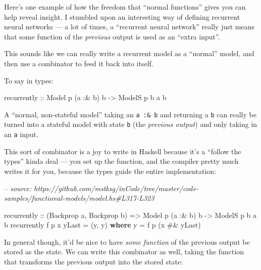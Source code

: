 \documentclass[]{article}
\newenvironment{Shaded}{}{}
\newcommand{\CommentTok}[1]{\textcolor[rgb]{0.38,0.63,0.69}{\textit{#1}}}
\newcommand{\DataTypeTok}[1]{\textcolor[rgb]{0.56,0.13,0.00}{#1}}
\newcommand{\FunctionTok}[1]{\textcolor[rgb]{0.02,0.16,0.49}{#1}}
\newcommand{\KeywordTok}[1]{\textcolor[rgb]{0.00,0.44,0.13}{\textbf{#1}}}
\newcommand{\NormalTok}[1]{#1}
\newcommand{\OtherTok}[1]{\textcolor[rgb]{0.00,0.44,0.13}{#1}}
\begin{document}
Here's one example of how the freedom that ``normal functions'' gives you can
help reveal insight. I stumbled upon an interesting way of defining recurrent
neural networks --- a lot of times, a ``recurrent neural network'' really just
means that some function of the \emph{previous} output is used as an ``extra
input''.

This sounds like we can really write a recurrent model as a ``normal'' model,
and then use a combinator to feed it back into itself.

To say in types:

\begin{Shaded}
\begin{Highlighting}[]
\NormalTok{recurrently}
\OtherTok{    ::} \DataTypeTok{Model}\NormalTok{  p   (a }\FunctionTok{:&}\NormalTok{ b) b}
    \OtherTok{->} \DataTypeTok{ModelS}\NormalTok{ p b  a       b}
\end{Highlighting}
\end{Shaded}

A ``normal, non-stateful model'' taking an \texttt{a\ :\&\ b} and returning a
\texttt{b} can really be turned into a stateful model with state \texttt{b} (the
\emph{previous output}) and only taking in an \texttt{a} input.

This sort of combinator is a joy to write in Haskell because it's a ``follow the
types'' kinda deal --- you set up the function, and the compiler pretty much
writes it for you, because the types guide the entire implementation:

\begin{Shaded}
\begin{Highlighting}[]
\CommentTok{-- source: https://github.com/mstksg/inCode/tree/master/code-samples/functional-models/model.hs#L317-L323}

\NormalTok{recurrently}
\OtherTok{    ::}\NormalTok{ (}\DataTypeTok{Backprop}\NormalTok{ a, }\DataTypeTok{Backprop}\NormalTok{ b)}
    \OtherTok{=>} \DataTypeTok{Model}\NormalTok{  p   (a }\FunctionTok{:&}\NormalTok{ b) b}
    \OtherTok{->} \DataTypeTok{ModelS}\NormalTok{ p b  a       b}
\NormalTok{recurrently f p x yLast }\FunctionTok{=}\NormalTok{ (y, y)}
  \KeywordTok{where}
\NormalTok{    y }\FunctionTok{=}\NormalTok{ f p (x }\FunctionTok{#&}\NormalTok{ yLast)}
\end{Highlighting}
\end{Shaded}

In general though, it'd be nice to have \emph{some function} of the previous
output be stored as the state. We can write this combinator as well, taking the
function that transforms the previous output into the stored state:
\end{document}
